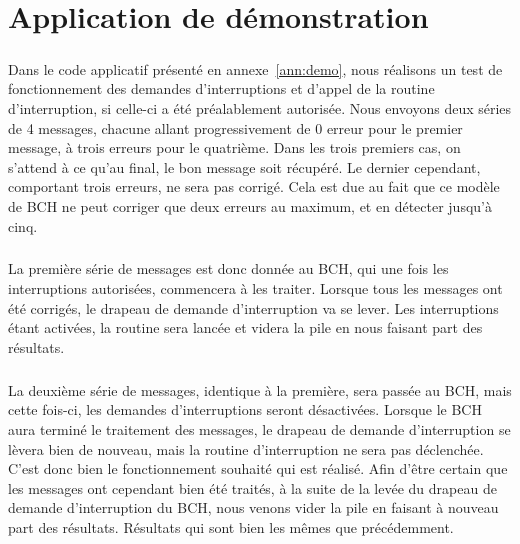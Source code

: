 \documentclass[a4paper, 11pt, svgnames]{report}
\begin{document}
    \chapter{Application de démonstration}

        \paragraph{}
        Dans le code applicatif présenté en annexe~\ref{ann:demo}, nous
        réalisons un test de fonctionnement des demandes d'interruptions et
        d'appel de la routine d'interruption, si celle-ci a été préalablement
        autorisée. Nous envoyons deux séries de 4 messages, chacune allant
        progressivement de 0 erreur pour le premier message, à trois erreurs
        pour le quatrième. Dans les trois premiers cas, on s'attend à ce qu'au
        final, le bon message soit récupéré. Le dernier cependant, comportant
        trois erreurs, ne sera pas corrigé. Cela est due au fait que ce modèle
        de BCH ne peut corriger que deux erreurs au maximum, et en détecter
        jusqu'à cinq.

        \paragraph{}
        La première série de messages est donc donnée au BCH, qui une fois les
        interruptions autorisées, commencera à les traiter. Lorsque tous les
        messages ont été corrigés, le drapeau de demande d'interruption va se
        lever. Les interruptions étant activées, la routine sera lancée et
        videra la pile en nous faisant part des résultats.

        \paragraph{}
        La deuxième série de messages, identique à la première, sera passée au
        BCH, mais cette fois-ci, les demandes d'interruptions seront
        désactivées. Lorsque le BCH aura terminé le traitement des messages,
        le drapeau de demande d'interruption se lèvera bien de nouveau, mais
        la routine d'interruption ne sera pas déclenchée. C'est donc bien le
        fonctionnement souhaité qui est réalisé. Afin d'être certain que les
        messages ont cependant bien été traités, à la suite de la levée du
        drapeau de demande d'interruption du BCH, nous venons vider la pile
        en faisant à nouveau part des résultats. Résultats qui sont bien les
        mêmes que précédemment.
\end{document}
